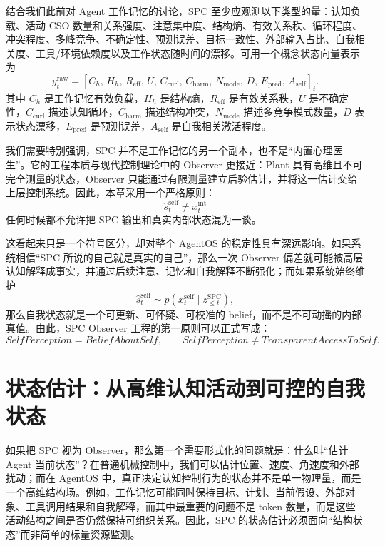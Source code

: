 结合我们此前对 Agent 工作记忆的讨论，SPC 至少应观测以下类型的量：认知负载、活动 CSO 数量和关系强度、注意集中度、结构熵、有效关系秩、循环程度、冲突程度、多峰竞争、不确定性、预测误差、目标一致性、外部输入占比、自我相关度、工具/环境依赖度以及工作状态随时间的漂移。可用一个概念状态向量表示为
\begin{equation}
y_t^{\mathrm{raw}}
=
\left[
C_h,\,
H_h,\,
R_{\mathrm{eff}},\,
U,\,
C_{\mathrm{curl}},\,
C_{\mathrm{harm}},\,
N_{\mathrm{mode}},\,
D,\,
E_{\mathrm{pred}},\,
A_{\mathrm{self}}
\right]_t.
\end{equation}
其中 $C_h$ 是工作记忆有效负载，$H_h$ 是结构熵，$R_{\mathrm{eff}}$ 是有效关系秩，$U$ 是不确定性，$C_{\mathrm{curl}}$ 描述认知循环，$C_{\mathrm{harm}}$ 描述结构冲突，$N_{\mathrm{mode}}$ 描述多竞争模式数量，$D$ 表示状态漂移，$E_{\mathrm{pred}}$ 是预测误差，$A_{\mathrm{self}}$ 是自我相关激活程度。

我们需要特别强调，SPC 并不是工作记忆的另一个副本，也不是“内置心理医生”。它的工程本质与现代控制理论中的 Observer 更接近：Plant 具有高维且不可完全测量的状态，Observer 只能通过有限测量建立后验估计，并将这一估计交给上层控制系统。因此，本章采用一个严格原则：
\begin{equation}
\boxed{
\hat s_t^{\mathrm{self}}
\neq
x_t^{\mathrm{int}}
}
\end{equation}
任何时候都不允许把 SPC 输出和真实内部状态混为一谈。

这看起来只是一个符号区分，却对整个 AgentOS 的稳定性具有深远影响。如果系统相信“SPC 所说的自己就是真实的自己”，那么一次 Observer 偏差就可能被高层认知解释成事实，并通过后续注意、记忆和自我解释不断强化；而如果系统始终维护
\begin{equation}
\hat s_t^{\mathrm{self}}
\sim
p
\left(
x_t^{\mathrm{self}}
\mid
z_{\leq t}^{\mathrm{SPC}}
\right),
\end{equation}
那么自我状态就是一个可更新、可怀疑、可校准的 belief，而不是不可动摇的内部真值。由此，SPC Observer 工程的第一原则可以正式写成：
\begin{equation}
\boxed{
SelfPerception
=
BeliefAboutSelf,
\qquad
SelfPerception
\neq
TransparentAccessToSelf.
}
\end{equation}

\section{状态估计：从高维认知活动到可控的自我状态}
\label{sec:spc-state-estimation}

如果把 SPC 视为 Observer，那么第一个需要形式化的问题就是：什么叫“估计 Agent 当前状态”？在普通机械控制中，我们可以估计位置、速度、角速度和外部扰动；而在 AgentOS 中，真正决定认知控制行为的状态并不是单一物理量，而是一个高维结构场。例如，工作记忆可能同时保持目标、计划、当前假设、外部对象、工具调用结果和自我解释，而其中最重要的问题不是 token 数量，而是这些活动结构之间是否仍然保持可组织关系。因此，SPC 的状态估计必须面向“结构状态”而非简单的标量资源监测。


